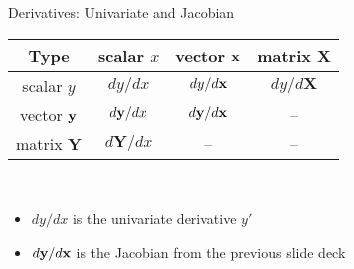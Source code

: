 \documentclass[11pt,compress,t,notes=noshow, xcolor=table]{beamer}
\newcommand{\deriv}{d}
\begin{document}
\begin{vbframe}{Derivatives: Univariate and Jacobian}
        \vspace{0.5\baselineskip}
        \begin{table}
            \centering
            \begin{tabular}{c||c|c|c}
                 Type & scalar $x$ & vector $\mathbf{x}$ & matrix $\mathbf{X}$ \\ \hline\hline
                 scalar $y$ &\cellcolor{customblue} $\deriv y / \deriv x$ & $\deriv y / \deriv\xv$ & $\deriv y / \deriv\mathbf{X}$ \\ \hline
                 vector $\mathbf{y}$ & $\deriv\yv / \deriv x$ & \cellcolor{customblue}$\deriv\yv / \deriv\xv$ & -- \\ \hline
                 matrix $\mathbf{Y}$ & $\deriv\mathbf{Y} / \deriv x$ & -- & --
            \end{tabular}
        \end{table}\,\\
        \begin{itemize}
        \item $\deriv y / \deriv x$ is the univariate derivative $y'$\\[\baselineskip]
            \item $\deriv\yv / \deriv\xv$ is the Jacobian from the previous slide deck
        \end{itemize}
\end{vbframe}
\end{document}
